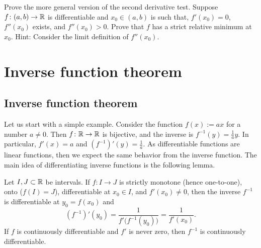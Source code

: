 \begin{exercise}
Prove the more general version of the second derivative test.
Suppose $f \colon (a,b) \to {\mathbb{R}}$ is differentiable and $x_0 \in (a,b)$
is such that, $f'(x_0) = 0$, $f''(x_0)$ exists, and $f''(x_0) > 0$.
Prove that $f$ has a strict relative
minimum at $x_0$.  Hint: Consider the limit definition of $f''(x_0)$.
\end{exercise}


\sectionnewpage
\section{Inverse function theorem}
\label{sec:ift}


\subsection{Inverse function theorem}

Let us start with a simple example.  Consider the function $f(x) := a x$ for a
number $a \not= 0$.  Then $f \colon {\mathbb{R}} \to {\mathbb{R}}$ is bijective, and the inverse
is $f^{-1}(y) = \frac{1}{a} y$.  In particular, $f'(x) = a$ and 
$(f^{-1})'(y) = \frac{1}{a}$.  As differentiable functions are
 linear functions, then we expect the same
behavior from the inverse function.
The main idea of differentiating inverse functions is the following lemma.

\begin{lemma} \label{lemma:ift}
Let $I,J \subset {\mathbb{R}}$ be intervals.
If $f \colon I \to J$ is strictly monotone (hence one-to-one),
onto ($f(I) = J$),
differentiable at $x_0 \in I$, and $f'(x_0) \not= 0$,
then the inverse 
$f^{-1}$ is differentiable at $y_0 = f(x_0)$ and
\begin{equation*}
(f^{-1})'(y_0) = \frac{1}{f'\bigl( f^{-1}(y_0) \bigr)} = \frac{1}{f'(x_0)} .
\end{equation*}
If $f$ is continuously differentiable and $f'$ is never zero, then $f^{-1}$
is continuously differentiable.
\end{lemma}

